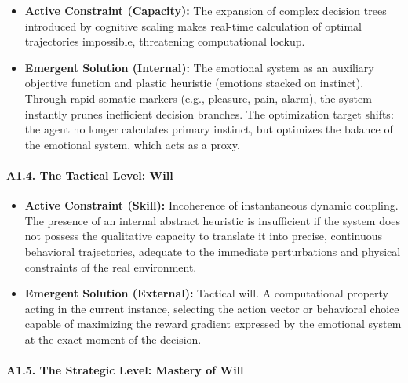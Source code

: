 \documentclass[11pt,a4paper,oneside]{article} %
\providecommand{\tightlist}{%
  \setlength{\itemsep}{0pt}\setlength{\parskip}{0pt}}
\begin{document}
\begin{itemize}
\tightlist
\item
  \textbf{Active Constraint (Capacity):} The expansion of complex
  decision trees introduced by cognitive scaling makes real-time
  calculation of optimal trajectories impossible, threatening
  computational lockup.
\item
  \textbf{Emergent Solution (Internal):} The emotional system as an
  auxiliary objective function and plastic heuristic (emotions stacked
  on instinct). Through rapid somatic markers (e.g., pleasure, pain,
  alarm), the system instantly prunes inefficient decision branches. The
  optimization target shifts: the agent no longer calculates primary
  instinct, but optimizes the balance of the emotional system, which
  acts as a proxy.
\end{itemize}

\hypertarget{a1.4.-the-tactical-level-will}{%
\paragraph{A1.4. The Tactical Level:
Will}\label{a1.4.-the-tactical-level-will}}

\begin{itemize}
\tightlist
\item
  \textbf{Active Constraint (Skill):} Incoherence of instantaneous
  dynamic coupling. The presence of an internal abstract heuristic is
  insufficient if the system does not possess the qualitative capacity
  to translate it into precise, continuous behavioral trajectories,
  adequate to the immediate perturbations and physical constraints of
  the real environment.
\item
  \textbf{Emergent Solution (External):} Tactical will. A computational
  property acting in the current instance, selecting the action vector
  or behavioral choice capable of maximizing the reward gradient
  expressed by the emotional system at the exact moment of the decision.
\end{itemize}

\hypertarget{a1.5.-the-strategic-level-mastery-of-will}{%
\paragraph{A1.5. The Strategic Level: Mastery of
Will}\label{a1.5.-the-strategic-level-mastery-of-will}}
\end{document}
